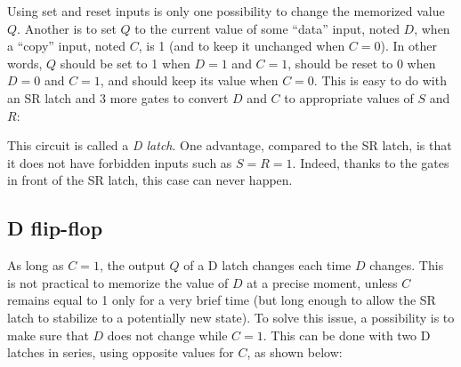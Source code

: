 Using set and reset inputs is only one possibility to change the memorized
value $Q$. Another is to set $Q$ to the current value of some ``data'' input,
noted $D$, when a ``copy'' input, noted $C$, is 1 (and to keep it unchanged
when $C=0$). In other words, $Q$ should be set to 1 when $D=1$ and $C=1$,
should be reset to 0 when $D=0$ and $C=1$, and should keep its value when
$C=0$. This is easy to do with an SR latch and 3 more gates to convert $D$ and
$C$ to appropriate values of $S$ and $R$:

\begin{center}
  
\end{center}

This circuit is called a {\em D latch}. One advantage, compared to the SR
latch, is that it does not have forbidden inputs such as $S=R=1$. Indeed,
thanks to the gates in front of the SR latch, this case can never happen.

\subsection{D flip-flop}

As long as $C=1$, the output $Q$ of a D latch changes each time $D$ changes.
This is not practical to memorize the value of $D$ at a precise moment, unless
$C$ remains equal to 1 only for a very brief time (but long enough to allow the
SR latch to stabilize to a potentially new state). To solve this issue, a
possibility is to make sure that $D$ does not change while $C=1$. This can be
done with two D latches in series, using opposite values for $C$, as shown
below:

\begin{center}
  
\end{center}

